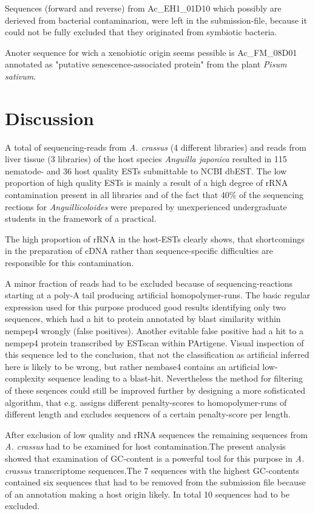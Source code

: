 \documentclass[12pt,a4paper]{article}
\begin{document}
Sequences (forward and reverse) from Ac\_EH1\_01D10 which possibly are
derieved from bacterial contaminarion, were left in the
submission-file, because it could not be fully excluded that they
originated from symbiotic bacteria.

Anoter sequence for wich a xenobiotic origin seems pessible is
Ac\_FM\_08D01 annotated as "putative senescence-associated protein"
from the plant \textit{Pisum sativum}.

\section*{Discussion}

A total of  sequencing-reads from
\textit{A. crassus} (4 different libraries) and
 reads from liver tissue (3 libraries)
of the host species \textit{Anguilla japonica} resulted in
115 nematode- and
36 host quality ESTs submittable to NCBI
dbEST. The low proportion of high quality ESTs is mainly a result of a
high degree of rRNA contamination present in all libraries and of the
fact that 40\% of the sequencing rections for
\textit{Anguillicoloides} were prepared by unexperienced undergraduate
students in the framework of a practical.

The high proportion of rRNA in the host-ESTs clearly shows, that
shortcomings in the preparation of cDNA rather than sequence-specific
difficulties are responsible for this contamination.

A minor fraction of reads had to be excluded because of
sequencing-reactions starting at a poly-A tail producing artificial
homopolymer-runs. The basic regular expression used for this purpose
produced good results identifying only two sequences, which had a hit
to protein annotated by blast similarity within nempep4 wrongly (false
positives). Another evitable false positive had a hit to a nempep4
protein transcribed by ESTscan\cite{estscan} within PArtigene. Visual
inspection of this sequence led to the conclusion, that not the
classification as artificial inferred here is likely to be wrong, but
rather nembase4 contains an artificial low-complexity sequence leading
to a blast-hit. Nevertheless the method for filtering of these
seqences could still be improved further by designing a more
sofisticated algorithm, that e.g. assigns different penalty-scores to
homopolymer-runs of different length and excludes sequences of a
certain penalty-score per length.

After exclusion of low quality and rRNA sequences the remaining
sequences from \textit{A. crassus} had to be examined for host
contamination.The present analysis showed that examination of
GC-content is a powerful tool for this purpose in \textit{A. crassus}
transcriptome sequences.The 7 sequences with the highest GC-contents
contained six sequences that had to be removed from the submission
file because of an annotation making a host origin likely. In total 10
sequences had to be excluded.
\end{document}
